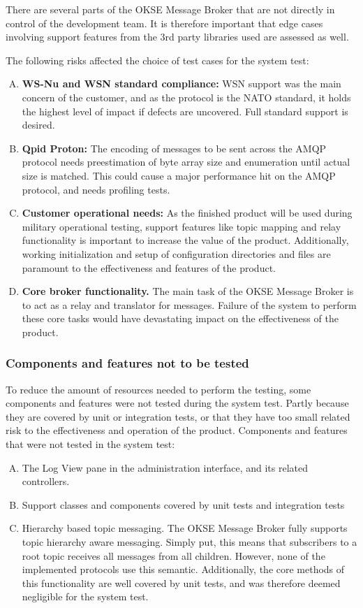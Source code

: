 There are several parts of the OKSE Message Broker that are not directly in control of the development team. It is therefore important that edge cases involving support features from the 3rd party libraries used are assessed as well.

The following risks affected the choice of test cases for the system test:

\begin{enumerate}[A.]
\item \textbf{WS-Nu and WSN standard compliance:} WSN support was the main concern of the customer, and as the protocol is the NATO standard, it holds the highest level of impact if defects are uncovered. Full standard support is desired.
\item \textbf{Qpid Proton:} The encoding of messages to be sent across the AMQP protocol needs preestimation of byte array size and enumeration until actual size is matched. This could cause a major performance hit on the AMQP protocol, and needs profiling tests.
\item \textbf{Customer operational needs:} As the finished product will be used during military operational testing, support features like topic mapping and relay functionality is important to increase the value of the product. Additionally, working initialization and setup of configuration directories and files are paramount to the effectiveness and features of the product.
\item \textbf{Core broker functionality.} The main task of the OKSE Message Broker is to act as a relay and translator for messages. Failure of the system to perform these core tasks would have devastating impact on the effectiveness of the product.
\end{enumerate}

\subsubsection{Components and features not to be tested}

To reduce the amount of resources needed to perform the testing, some components and features were not tested during the system test. Partly because they are covered by unit or integration tests, or that they have too small related risk to the effectiveness and operation of the product.
Components and features that were not tested in the system test:

\begin{enumerate}[A.]
\item The Log View pane in the administration interface, and its related controllers.
\item Support classes and components covered by unit tests and integration tests
\item Hierarchy based topic messaging. The OKSE Message Broker fully supports topic hierarchy aware messaging. Simply put, this means that subscribers to a root topic receives all messages from all children. However, none of the implemented protocols use this semantic. Additionally, the core methods of this functionality are well covered by unit tests, and was therefore deemed negligible for the system test.
\end{enumerate}

